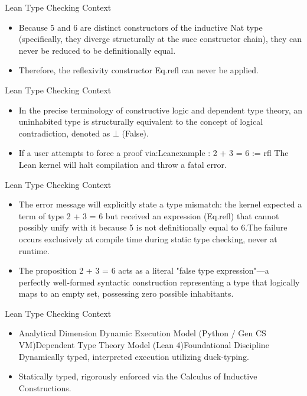 \documentclass[10pt]{beamer}
\begin{document}
\begin{frame}{Lean Type Checking Context}
\begin{itemize}\setlength{\itemsep}{1.5em}
  \item Because 5 and 6 are distinct constructors of the inductive Nat type (specifically, they diverge structurally at the succ constructor chain), they can never be reduced to be definitionally equal.
  \item Therefore, the reflexivity constructor Eq.refl can never be applied.
\end{itemize}
\end{frame}

\begin{frame}{Lean Type Checking Context}
\begin{itemize}\setlength{\itemsep}{1.5em}
  \item In the precise terminology of constructive logic and dependent type theory, an uninhabited type is structurally equivalent to the concept of logical contradiction, denoted as $\bot$ (False).
  \item If a user attempts to force a proof via:Leanexample : 2 + 3 = 6 := rfl
The Lean kernel will halt compilation and throw a fatal error.
\end{itemize}
\end{frame}

\begin{frame}{Lean Type Checking Context}
\begin{itemize}\setlength{\itemsep}{1.5em}
  \item The error message will explicitly state a type mismatch: the kernel expected a term of type 2 + 3 = 6 but received an expression (Eq.refl) that cannot possibly unify with it because 5 is not definitionally equal to 6.The failure occurs exclusively at compile time during static type checking, never at runtime.
  \item The proposition 2 + 3 = 6 acts as a literal "false type expression"—a perfectly well-formed syntactic construction representing a type that logically maps to an empty set, possessing zero possible inhabitants.
\end{itemize}
\end{frame}

\begin{frame}{Lean Type Checking Context}
\begin{itemize}\setlength{\itemsep}{1.5em}
  \item Analytical Dimension Dynamic Execution Model (Python / Gen CS VM)Dependent Type Theory Model (Lean 4)Foundational Discipline Dynamically typed, interpreted execution utilizing duck-typing.
  \item Statically typed, rigorously enforced via the Calculus of Inductive Constructions.
\end{itemize}
\end{frame}
\end{document}
